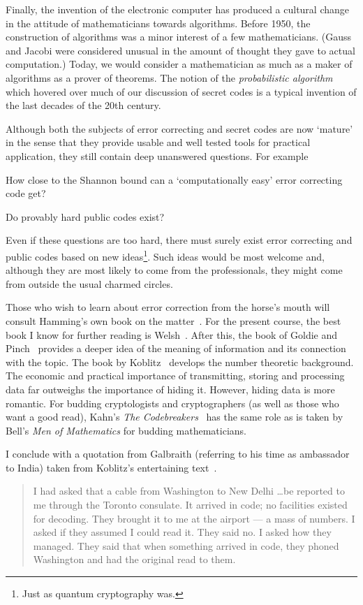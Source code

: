 \documentclass[12pt,a4paper]{article}
\theoremstyle{plain}
\theoremstyle{definition}
\begin{document}
    Finally, the invention of the electronic computer
    has produced a cultural change in the attitude
    of mathematicians towards algorithms. Before 1950,
    the construction of algorithms was a minor interest
    of a few mathematicians. (Gauss and Jacobi were
    considered unusual in the amount of thought they
    gave to actual computation.) Today, we would consider
    a mathematician
    as much as a maker of algorithms as a prover of theorems.
    The notion of the \emph{probabilistic algorithm}
    which hovered over much of our discussion of
    secret codes is a typical invention of the last
    decades of the 20th century.

    Although both the subjects of error correcting and
    secret codes are now `mature' in the
    sense that they provide usable and well tested
    tools for practical application, they still
    contain deep unanswered questions. For example

    How close to the Shannon bound can a
    `computationally easy' error correcting code
    get?

    Do provably hard public codes exist?

    Even if these questions are too hard, there
    must surely exist error correcting and public
    codes based on new ideas\footnote{Just as quantum
    cryptography was.}. Such ideas would
    be most welcome
    and, although they are most likely to come
    from the professionals, they might come
    from outside the usual charmed circles.

    Those who wish to learn about error correction
    from the horse's mouth will consult Hamming's
    own book on the matter~\cite{Hamming}.
    For the present course,
    the best book I know for further reading
    is Welsh~\cite{Welsh}. After this,
    the book of Goldie and Pinch~\cite{Pinch} provides
    a deeper idea of the meaning of information
    and its connection with the topic. The book by
    Koblitz~\cite{Koblitz} develops the number theoretic
    background.
    The economic and practical importance of
    transmitting, storing and processing data
    far outweighs the importance of hiding it.
    However, hiding data is more romantic.
    For budding cryptologists and cryptographers
    (as well as those who want a good read),
    Kahn's \emph{The Codebreakers}~\cite{Kahn Code}
    has the same role as is taken by Bell's
    \emph{Men of Mathematics}
    for budding mathematicians.


    I conclude with a quotation from Galbraith
    (referring to his time as ambassador to India)
    taken from Koblitz's entertaining text~\cite{Koblitz}.
    \begin{quotation}
        I had asked that a cable from Washington to New Delhi
        \dots be reported to me through the Toronto consulate.
        It arrived in code; no facilities existed for decoding.
        They brought it to me at the airport --- a mass of
        numbers. I asked if they assumed I could read it.
        They said no. I asked how they managed.
        They said that when something arrived in code,
        they phoned Washington and had the original
        read to them.
    \end{quotation}
\end{document}
